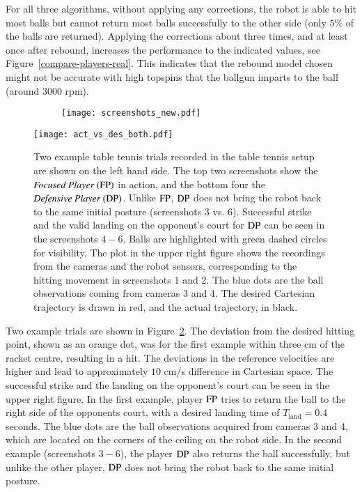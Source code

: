 %
For all three algorithms, without applying any corrections, the robot is able to hit most balls but cannot return most balls successfully to the other side (only $5\%$ of the balls are returned). Applying the corrections about three times, and at least once after rebound, increases the performance to the indicated values, see Figure~\ref{compare-players-real}. This indicates that the rebound model chosen might not be accurate with high topspins that the ballgun imparts to the ball (around $3000$ rpm). 
%
%
\begin{figure*}
	\begin{minipage}[b]{.5\linewidth}
		\begin{subfigure}[t]{0.5\textwidth}
			\texttt{[image: screenshots\_new.pdf]}
			\label{screenshots}
		\end{subfigure}
	\end{minipage}%
	\begin{minipage}[b]{.5\linewidth}
		\texttt{[image: act\_vs\_des\_both.pdf]}
		\label{act-vs-des-cartesian}
	\end{minipage}
	\caption{Two example table tennis trials recorded in the table tennis setup are shown on the left hand side. The top two screenshots show the $\emph{Focused Player} \ (\mathrm{FP})$ in action, and the bottom four the $\emph{Defensive Player} \ (\mathrm{DP})$. Unlike $\mathrm{FP}$, $\mathrm{DP}$ does not bring the robot back to the same initial posture (screenshots 3 vs. 6). Successful strike and the valid landing on the opponent's court for $\mathrm{DP}$ can be seen in the screenshots $4-6$. Balls are highlighted with green dashed circles for visibility. The plot in the upper right figure shows the recordings from the cameras and the robot sensors, corresponding to the hitting movement in screenshots 1 and 2. The blue dots are the ball observations coming from cameras 3 and 4. The desired Cartesian trajectory is drawn in red, and the actual trajectory, in black.}
	\label{exampleTT}
\end{figure*}
%
Two example trials are shown in Figure~\ref{exampleTT}. The deviation from the desired hitting point, shown as an orange dot, was for the first example within three cm of the racket centre, resulting in a hit. The deviations in the reference velocities are higher and lead to approximately $10$ cm/s difference in Cartesian space. The successful strike and the landing on the opponent's court can be seen in the upper right figure. In the first example, player $\mathrm{FP}$ tries to return the ball to the right side of the opponents court, with a desired landing time of $T_{\textrm{land}} = 0.4$ seconds. The blue dots are the ball observations acquired from cameras 3 and 4, which are located on the corners of the ceiling on the robot side. In the second example (screenshots $3-6$), the player $\mathrm{DP}$ also returns the ball successfully, but unlike the other player, $\mathrm{DP}$ does not bring the robot back to the same initial posture.
